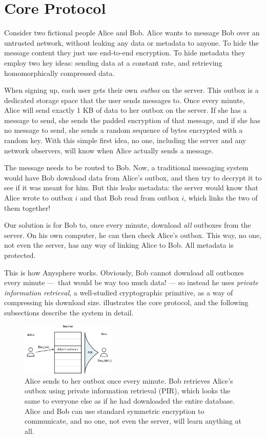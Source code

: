 \section{Core Protocol}
\label{sec:coreprotocol}

Consider two fictional people Alice and Bob. Alice wants to message Bob over an untrusted network, without leaking any data or metadata to anyone. To hide the message content they just use end-to-end encryption. To hide metadata they employ two key ideas: sending data at a constant rate, and retrieving homomorphically compressed data.

When signing up, each user gets their own \textit{outbox} on the server. This outbox is a dedicated storage space that the user sends messages to. Once every minute, Alice will send exactly 1 KB of data to her outbox on the server. If she has a message to send, she sends the padded encryption of that message, and if she has no message to send, she sends a random sequence of bytes encrypted with a random key. With this simple first idea, no one, including the server and any network observers, will know when Alice actually sends a message.

The message needs to be routed to Bob. Now, a traditional messaging system would have Bob download data from Alice's outbox, and then try to decrypt it to see if it was meant for him. But this leaks metadata: the server would know that Alice wrote to outbox $i$ and that Bob read from outbox $i$, which links the two of them together!

Our solution is for Bob to, once every minute, download \textit{all} outboxes from the server. On his own computer, he can then check Alice's outbox. This way, no one, not even the server, has any way of linking Alice to Bob. All metadata is protected.

This is how Anysphere works. Obviously, Bob cannot download all outboxes every minute — that would be way too much data! — so instead he uses \textit{private information retrieval}, a well-studied cryptographic primitive, as a way of compressing his download size.  illustrates the core protocol, and the following subsections describe the system in detail.

\begin{figure}
    \centering
    \includegraphics[width=0.4\textwidth]{pirfigure.pdf}
\caption{Alice sends to her outbox once every minute. Bob retrieves Alice's outbox using private information retrieval (PIR), which looks the same to everyone else as if he had downloaded the entire database. Alice and Bob can use standard symmetric encryption to communicate, and no one, not even the server, will learn anything at all.}
\label{fig:highlevelpir}
\end{figure}



